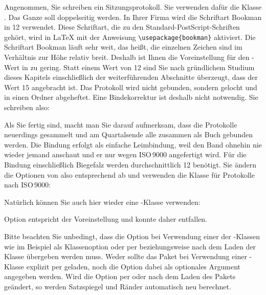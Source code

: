 \begin{Example}
  Angenommen, Sie schreiben ein Sitzungsprotokoll. Sie verwenden dafür die
  Klasse . Das Ganze soll doppelseitig werden. In Ihrer Firma
  wird die Schriftart Bookman in 12 verwendet. Diese Schriftart, die
  zu den Standard-PostScript-Schriften gehört, wird in {\LaTeX} mit der
  Anweisung \verb|\usepackage{bookman}| aktiviert.  Die Schriftart Bookman
  läuft sehr weit, das heißt, die einzelnen Zeichen sind im Verhältnis zur
  Höhe relativ breit. Deshalb ist Ihnen die Voreinstellung für den
  -Wert in  zu gering. Statt einem Wert von 12 sind
  Sie nach gründlichem Studium dieses Kapitels einschließlich der
  weiterführenden Abschnitte überzeugt, dass der Wert 15 angebracht ist. Das
  Protokoll wird nicht gebunden, sondern gelocht und in einen Ordner
  abgeheftet. Eine Bindekorrektur ist deshalb nicht notwendig. Sie schreiben
  also:
  Als Sie fertig sind, macht man Sie darauf aufmerksam, dass die
  Protokolle neuerdings gesammelt und am Quartalsende alle zusammen
  als Buch gebunden werden. Die Bindung erfolgt als
  einfache Leimbindung, weil den Band ohnehin nie wieder jemand
  anschaut und er nur wegen ISO\,9000 angefertigt wird. Für die Bindung
  einschließlich Biegefalz werden durchschnittlich 12
  benötigt. Sie ändern die Optionen von  also
  entsprechend ab und verwenden die Klasse für Protokolle nach
  ISO\,9000:
  Natürlich können Sie auch hier wieder eine \KOMAScript-Klasse
  verwenden:
\iftrue%
  Option  entspricht der Voreinstellung und konnte daher
  entfallen.
\else
  Die Option \Option{a4paper} konnte bei der Klasse \Class{scrartcl} entfallen,
  da diese der Voreinstellung bei allen \KOMAScript-Klassen entspricht.
\fi
\end{Example}

Bitte beachten Sie unbedingt, dass die Option 
bei Verwendung einer der \KOMAScript-Klassen wie im Beispiel als Klassenoption
oder per  beziehungsweise
 nach dem Laden der Klasse übergeben werden
muss. Weder sollte das Paket  bei Verwendung einer
\KOMAScript-Klasse explizit per  geladen,
noch die Option dabei als optionales Argument angegeben
werden. Wird die Option per
 oder 
nach dem Laden des Pakets geändert, so werden Satzspiegel und Ränder
automatisch neu berechnet.

